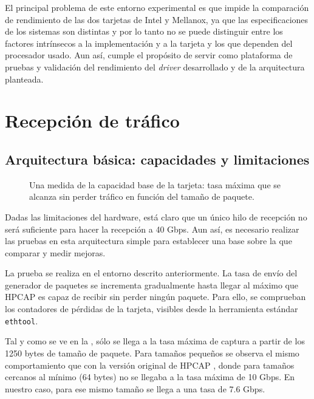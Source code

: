 \documentclass[twoside, 12pt]{epstfg}
\begin{document}
El principal problema de este entorno experimental es que impide la comparación de rendimiento de las dos tarjetas de Intel y Mellanox, ya que las especificaciones de los sistemas son distintas y por lo tanto no se puede distinguir entre los factores intrínsecos a la implementación y a la tarjeta y los que dependen del procesador usado. Aun así, cumple el propósito de servir como plataforma de pruebas y validación del rendimiento del \textit{driver} desarrollado y de la arquitectura planteada.

\section{Recepción de tráfico}

\subsection{Arquitectura básica: capacidades y limitaciones}

\begin{figure}[htbp]
\caption[Capacidad de una arquitectura básica de captura]{Una medida de la capacidad base de la tarjeta: tasa máxima que se alcanza sin perder tráfico en función del tamaño de paquete.}
\label{fig:Validacion:SimpleArchRate}
\end{figure}

Dadas las limitaciones del hardware, está claro que un único hilo de recepción no será suficiente para hacer la recepción a 40 Gbps. Aun así, es necesario realizar las pruebas en esta arquitectura simple para establecer una base sobre la que comparar y medir mejoras.

La prueba se realiza en el entorno descrito anteriormente. La tasa de envío del generador de paquetes se incrementa gradualmente hasta llegar al máximo que HPCAP es capaz de recibir sin perder ningún paquete. Para ello, se comprueban los contadores de pérdidas de la tarjeta, visibles desde la herramienta estándar \texttt{ethtool}.

Tal y como se ve en la , sólo se llega a la tasa máxima de captura a partir de los 1250 bytes de tamaño de paquete. Para tamaños pequeños se observa el mismo comportamiento que con la versión original de HPCAP \citep{MorenoTFM2012}, donde para tamaños cercanos al mínimo (64 bytes) no se llegaba a la tasa máxima de 10 Gbps. En nuestro caso, para ese mismo tamaño se llega a una tasa de 7.6 Gbps.
\end{document}

